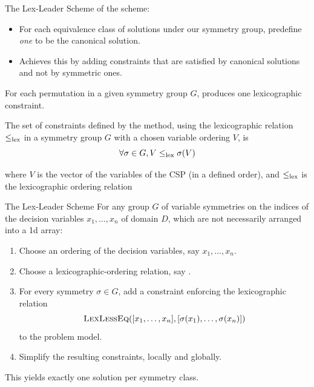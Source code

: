 \documentclass{cons-beamer}
\begin{document}
\begin{frame}{The Lex-Leader Scheme}\label{lex-leader}
   of the  scheme:
  \begin{itemize}
    \item For each equivalence class of solutions under our symmetry group, predefine \textit{one} to be the canonical solution.
    \item Achieves this by adding constraints that are satisfied by canonical solutions and not by symmetric ones.
  \end{itemize}
  \vfill

  For each permutation in a given symmetry group $G$,  produces one lexicographic constraint.
  \vfill

  The set of constraints defined by the  method, using the lexicographic relation $\leq_{\textnormal{lex}}$ in a symmetry group $G$ with a chosen variable ordering $V$, is
  $$\forall \sigma \in G, V \leq_{\textnormal{lex}} \sigma(V)$$

  where $V$ is the vector of the variables of the CSP (in a defined order), and $\leq_{\textnormal{lex}}$ is the lexicographic ordering
  relation
\end{frame}

\begin{frame}[fragile]{The Lex-Leader Scheme}
  For \alert{any} group $G$ of \alert{variable} symmetries on the
  indices of the decision variables $x_1,\dots,x_n$ of
  domain $D$, which are not necessarily arranged into a 1d array:
  \vfill

  \begin{enumerate}
    \item Choose an ordering of the decision variables, say
      $x_1,\dots,x_n$.  \vfill
    \item Choose a lexicographic-ordering relation, say . \vfill
    \item For every symmetry $\sigma \in G$, add a constraint enforcing the lexicographic relation
      $$\textsc{LexLessEq}([x_1,\dots,x_n],[\sigma(x_1),\dots,\sigma(x_n)])$$
      to the problem model. \vfill
    \item Simplify the resulting constraints, locally and globally.
  \end{enumerate}\vfill

  This yields \alert{exactly} one solution per symmetry class.
\end{frame}
\end{document}
